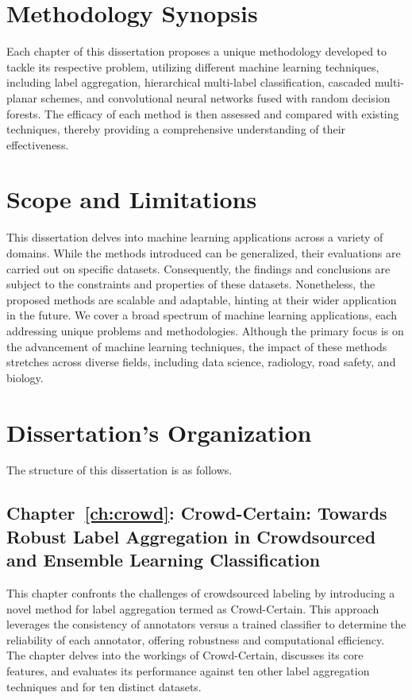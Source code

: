 \section{Methodology Synopsis}
Each chapter of this dissertation proposes a unique methodology developed to tackle its respective problem, utilizing different machine learning techniques, including label aggregation, hierarchical multi-label classification, cascaded multi-planar schemes, and convolutional neural networks fused with random decision forests. The efficacy of each method is then assessed and compared with existing techniques, thereby providing a comprehensive understanding of their effectiveness.
\section{Scope and Limitations}
This dissertation delves into machine learning applications across a variety of domains. While the methods introduced can be generalized, their evaluations are carried out on specific datasets. Consequently, the findings and conclusions are subject to the constraints and properties of these datasets. Nonetheless, the proposed methods are scalable and adaptable, hinting at their wider application in the future. We cover a broad spectrum of machine learning applications, each addressing unique problems and methodologies. Although the primary focus is on the advancement of machine learning techniques, the impact of these methods stretches across diverse fields, including data science, radiology, road safety, and biology.
\section{Dissertation's Organization}
The structure of this dissertation is as follows.
\subsection*{Chapter~\ref{ch:crowd}: Crowd-Certain: Towards Robust Label Aggregation in Crowdsourced and Ensemble Learning Classification}
This chapter confronts the challenges of crowdsourced labeling by introducing a novel method for label aggregation termed as Crowd-Certain. This approach leverages the consistency of annotators versus a trained classifier to determine the reliability of each annotator, offering robustness and computational efficiency. The chapter delves into the workings of Crowd-Certain, discusses its core features, and evaluates its performance against ten other label aggregation techniques and for ten distinct datasets.
